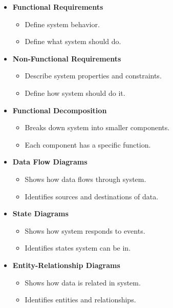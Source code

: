 \documentclass[10pt]{article}
\begin{document}
\begin{multicols}{5}
\begin{block}
  \begin{itemize}
    \item \textbf{Functional Requirements}
    \begin{itemize}
      \item Define system behavior.
      \item Define what system should do.
    \end{itemize}
    \item \textbf{Non-Functional Requirements}
    \begin{itemize}
      \item Describe system properties and constraints.
      \item Define how system should do it.
    \end{itemize}
  \end{itemize}
\end{block}

\begin{block}
  \begin{itemize}
    \item \textbf{Functional Decomposition}
    \begin{itemize}
      \item Breaks down system into smaller components.
      \item Each component has a specific function.
    \end{itemize}
    \item \textbf{Data Flow Diagrams}
    \begin{itemize}
      \item Shows how data flows through system.
      \item Identifies sources and destinations of data.
    \end{itemize}
    \item \textbf{State Diagrams}
    \begin{itemize}
      \item Shows how system responds to events.
      \item Identifies states system can be in.
    \end{itemize}
    \item \textbf{Entity-Relationship Diagrams}
    \begin{itemize}
      \item Shows how data is related in system.
      \item Identifies entities and relationships.
    \end{itemize}
  \end{itemize}
\end{block}


\end{multicols}
\end{document}
